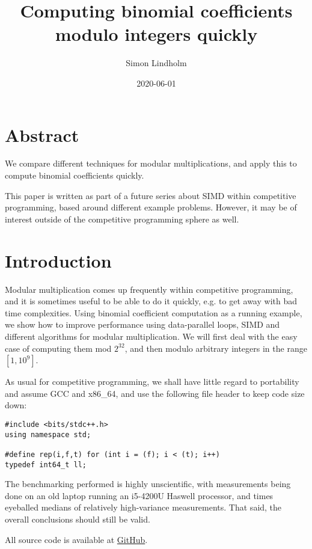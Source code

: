 \documentclass{article}
\title{Computing binomial coefficients modulo integers quickly}
\author{Simon Lindholm}
\date{2020-06-01}
\begin{document}
\maketitle

\section*{Abstract}
We compare different techniques for modular multiplications, and apply this to compute binomial coefficients quickly.

This paper is written as part of a future series about SIMD within competitive programming, based around different example problems.
However, it may be of interest outside of the competitive programming sphere as well.

\tableofcontents

\section{Introduction}

Modular multiplication comes up frequently within competitive programming,
and it is sometimes useful to be able to do it quickly, e.g. to get away
with bad time complexities.
Using binomial coefficient computation as a running example, we show how
to improve performance using data-parallel loops, SIMD and different
algorithms for modular multiplication.
We will first deal with the easy case of computing them mod $2^{32}$, and
then modulo arbitrary integers in the range $[1, 10^9]$.

As usual for competitive programming, we shall have
little regard to portability and assume GCC and x86\_64,
and use the following file header to keep code size down:

\begin{lstlisting}
#include <bits/stdc++.h>
using namespace std;

#define rep(i,f,t) for (int i = (f); i < (t); i++)
typedef int64_t ll;
\end{lstlisting}

The benchmarking performed is highly unscientific,
with measurements being done on an old laptop running an i5-4200U Haswell processor,
and times eyeballed medians of relatively high-variance measurements.
That said, the overall conclusions should still be valid.

All source code is available at \href{https://github.com/simonlindholm/simd-book/tree/master/binomial-coefficients}{GitHub}.




\end{document}
